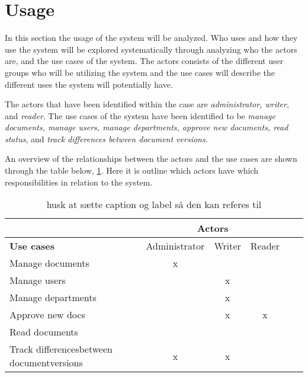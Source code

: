 \section{Usage}\label{sec:Usage}

In this section the usage of the system will be analyzed.
Who uses and how they use the system will be explored systematically through analyzing who the actors are, and the use cases of the system.
The actors consists of the different user groups who will be utilizing the system and the use cases will describe the different uses the system will potentially have.

The actors that have been identified within the case are \textit{administrator, writer}, and \textit{reader}.
The use cases of the system have been identified to be \textit{manage documents, manage users, manage departments, approve new documents, read status}, and \textit{track differences between document versions}.

An overview of the relationships between the actors and the use cases are shown through the table below, \cref{tab:UseCases}.
Here it is outline which actors have which responsibilities in relation to the system.

\begin{table}[H]
	\begin{center}
	\begin{tabular}{| m{10em} | c | c | c | c | c |}
		\hline
		& \multicolumn{3}{c|}{\textbf{Actors}} \\
		\hline
		\textbf{Use cases} & Administrator  & Writer & Reader \\
		\hline
		Manage documents & x & & \\
		\hline
		Manage users & & x & \\
		\hline
		Manage departments & & x & \\
		\hline
		Approve new docs & & x & x \\
		\hline
		Read documents & & & \\
		\hline
		Track differences\newline between document\newline versions & x & x &\\
		\hline
	\end{tabular}
	\end{center}
	\caption{ {\color{red}husk at sætte caption og label så den kan referes til} }\label{tab:UseCases}
\end{table}

